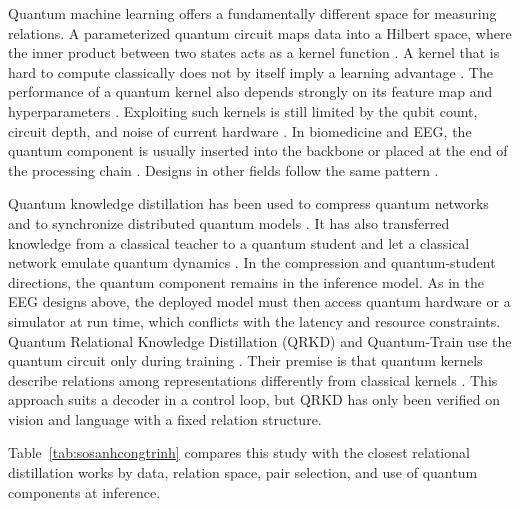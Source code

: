 Quantum machine learning offers a fundamentally different space for
measuring relations. A parameterized quantum circuit maps data into a
Hilbert space, where the inner product between two states acts as a kernel
function \cite{schuld2019quantum, schuld2020circuitcentric,
jerbi2023quantum}. A kernel that is hard to compute classically does not
by itself imply a learning advantage \cite{huang2021power}. The performance of a quantum kernel also depends strongly on its feature
map and hyperparameters \cite{jha2026comparative}. Exploiting such kernels
is still limited by the qubit count, circuit depth, and noise of current
hardware \cite{xie2025advances, alam2022qnet}. In biomedicine and EEG, the quantum component is usually inserted into
the backbone or placed at the end of the processing chain
\cite{idzikowski2026survey, chen2026exploring, olvera2024eegbased,
behera2026qsvmqnn, dutta2026duoqepinet}. Designs in other fields follow the
same pattern
\cite{wang2022development, griol-barres2021variational, qi2024qtnvqc}.

Quantum knowledge distillation has been used to compress quantum networks
\cite{yan2026distilling} and to synchronize distributed quantum models
\cite{oh2025quantum}. It has also transferred knowledge from a classical
teacher to a quantum student \cite{nishan2026quantummedkd,
barbato2026quantum} and let a classical network emulate quantum dynamics
\cite{yao2023emulating}. In the compression and quantum-student
directions, the quantum component remains in the inference model. As in
the EEG designs above, the deployed model must then access
quantum hardware or a simulator at run time, which conflicts with the
latency and resource constraints. Quantum Relational Knowledge
Distillation (QRKD) and Quantum-Train use the quantum circuit only during training \cite{liu2025quantum,
liu2025quantumtrain}. Their premise is that quantum kernels describe
relations among representations differently from classical kernels
\cite{liu2022representation}. This
approach suits a decoder in a control loop, but QRKD has only been
verified on vision and language with a fixed relation structure.

Table~\ref{tab:sosanhcongtrinh} compares this study with the closest
relational distillation works by data, relation space, pair selection, and
use of quantum components at inference.

